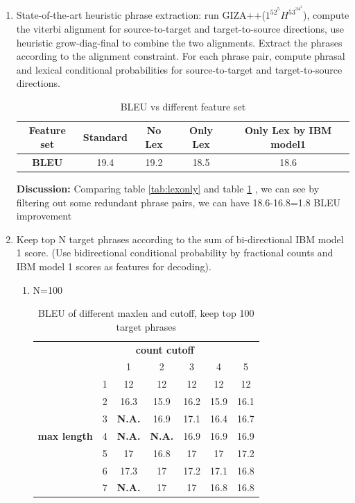 \documentclass[11pt, letterpaper]{article}   	%
\begin{document}
\begin{enumerate}
\item \label{app3} State-of-the-art heuristic phrase extraction: run GIZA++($1^52^5H^53^34^3$), compute the viterbi alignment for source-to-target and target-to-source directions, use heuristic grow-diag-final to combine the two alignments. Extract the phrases according to the alignment constraint. For each phrase pair, compute phrasal and lexical conditional probabilities for source-to-target and target-to-source directions.

\begin{table}[H]
\centering
\begin{tabular}{|c | c | c| c| c| }
\hline
\bf{Feature set} & \bf{Standard} & \bf{No Lex} &\bf{Only Lex} & \bf {Only Lex by IBM model1}\\
\hline
\bf{BLEU} & 19.4 & 19.2 & 18.5 & 18.6\\
\hline
\end{tabular}
\label{tab:BLEUStandard}
\caption{BLEU vs different  feature set }
\end{table}

\textbf{Discussion:} Comparing table \ref{tab:lexonly} and table \ref{tab:BLEUStandard} , we can see by filtering out some redundant phrase pairs, we can have 18.6-16.8=1.8 BLEU improvement

\item Keep top N target phrases according to the sum of bi-directional IBM model 1 score. (Use bidirectional conditional probability by fractional counts and IBM model 1 scores as features for decoding).
\begin{enumerate}
\item N=100
\begin{table}[H]
\centering
\begin{tabular}{ c c | c | c | c | c|c }
& \multicolumn{5}{c}{\bf{ count cutoff}}  \\
&  & 1 &	2 &	3 &	4 &	5\\
\hline
\multirow{7}{*}{\bf{max length}}
& 1 &	12 &	12 &	12 &	12 &	12\\
\cline{2-7}
& 2 &	16.3 &	15.9 &	16.2 &	15.9 &	16.1\\
\cline{2-7}
& 3 &	\bf{N.A.} &	16.9 &	17.1 &	16.4 &	16.7\\
\cline{2-7}
& 4 &	\bf{N.A.} &	\bf{N.A.} &	16.9 &	16.9 &	16.9\\
\cline{2-7}
& 5 &	17 &	16.8 &	17 &	17 &	17.2\\
\cline{2-7}
& 6 &	17.3 &	17 &	17.2 &	17.1 &	16.8\\
\cline{2-7}
& 7 &	\bf{N.A.} &	17 &	17 &	16.8 &	16.8\\
\hline
\end{tabular}
\label{tab:top100}
\caption{BLEU of different maxlen and cutoff, keep top 100 target phrases}
\end{table}


\end{enumerate}
\end{enumerate}
\end{document}
